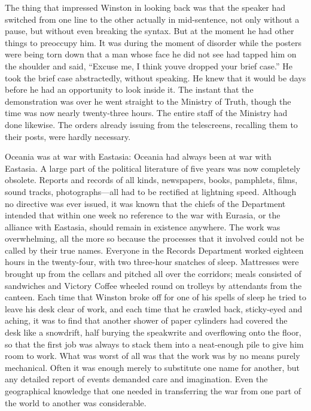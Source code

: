 The thing that impressed Winston in looking back was that the speaker
had switched from one line to the other actually in mid-sentence, not
only without a pause, but without even breaking the syntax. But at the
moment he had other things to preoccupy him. It was during the moment of
disorder while the posters were being torn down that a man whose face he
did not see had tapped him on the shoulder and said, ``Excuse me, I think
you\textquotesingle ve dropped your brief case.'' He took the brief case
abstractedly, without speaking. He knew that it would be days before he
had an opportunity to look inside it. The instant that the demonstration
was over he went straight to the Ministry of Truth, though the time was
now nearly twenty-three hours. The entire staff of the Ministry had done
likewise. The orders already issuing from the telescreens, recalling
them to their posts, were hardly necessary.

Oceania was at war with Eastasia: Oceania had always been at war with
Eastasia. A large part of the political literature of five years was now
completely obsolete. Reports and records of all kinds, newspapers,
books, pamphlets, films, sound tracks, photographs---all had to be
rectified at lightning speed. Although no directive was ever issued, it
was known that the chiefs of the Department intended that within one
week no reference to the war with Eurasia, or the alliance with
Eastasia, should remain in existence anywhere. The work was
overwhelming, all the more so because the processes that it involved
could not be called by their true names. Everyone in the Records
Department worked eighteen hours in the twenty-four, with two three-hour
snatches of sleep. Mattresses were brought up from the cellars and
pitched all over the corridors; meals consisted of sandwiches and
Victory Coffee wheeled round on trolleys by attendants from the canteen.
Each time that Winston broke off for one of his spells of sleep he tried
to leave his desk clear of work, and each time that he crawled back,
sticky-eyed and aching, it was to find that another shower of paper
cylinders had covered the desk like a snowdrift, half burying the
speakwrite and overflowing onto the floor, so that the first job was
always to stack them into a neat-enough pile to give him room to work.
What was worst of all was that the work was by no means purely
mechanical. Often it was enough merely to substitute one name for
another, but any detailed report of events demanded care and
imagination. Even the geographical knowledge that one needed in
transferring the war from one part of the world to another was
considerable.

